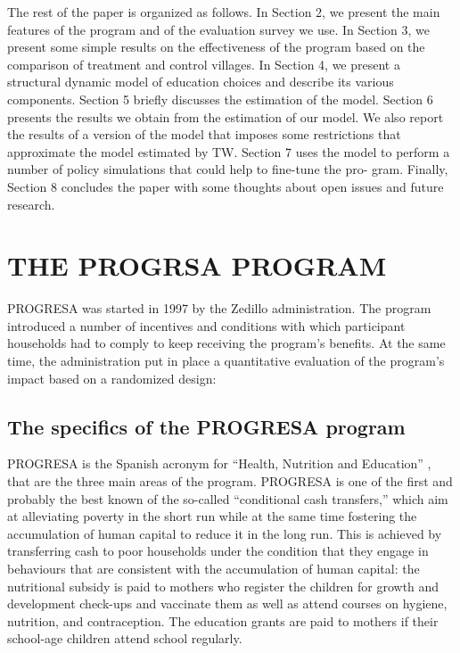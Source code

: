 \documentclass{handoutForSolutions}
\begin{document}
The rest of the paper is organized as follows. In Section 2, we present the main features of the program and of the evaluation survey we use. In Section 3, we present some simple results on the effectiveness of the program based on the comparison of treatment and control villages. In Section 4, we present a structural dynamic model of education choices and describe its various components. Section 5 briefly discusses the estimation of the model. Section 6 presents the results we obtain from the estimation of our model. We also report the results of a version of the model that imposes some restrictions that approximate the model estimated by TW. Section 7 uses the model to perform a number of policy simulations that could help to fine-tune the pro- gram. Finally, Section 8 concludes the paper with some thoughts about open issues and future research.




\newpage


\section{THE PROGRSA PROGRAM}
PROGRESA was started in 1997 by the Zedillo administration. The program introduced a number of incentives and conditions with which participant households had to comply to keep receiving the program’s benefits. At the same time, the administration put in place a quantitative evaluation of the program’s impact based on a randomized design:
\subsection{The specifics of the PROGRESA program}
PROGRESA is the Spanish acronym for “Health, Nutrition and Education” , that are the three main areas of the program. PROGRESA is one of the first and probably the best known of the so-called “conditional cash transfers,” which aim at alleviating poverty in the short run while at the same time fostering the accumulation of human capital to reduce it in the long run. This is achieved by transferring cash to poor households under the condition that they engage in behaviours that are consistent with the accumulation of human capital: the nutritional subsidy is paid to mothers who register the children for growth and development check-ups and vaccinate them as well as attend courses on hygiene, nutrition, and contraception. The education grants are paid to mothers if their school-age children attend school regularly.
\end{document}
